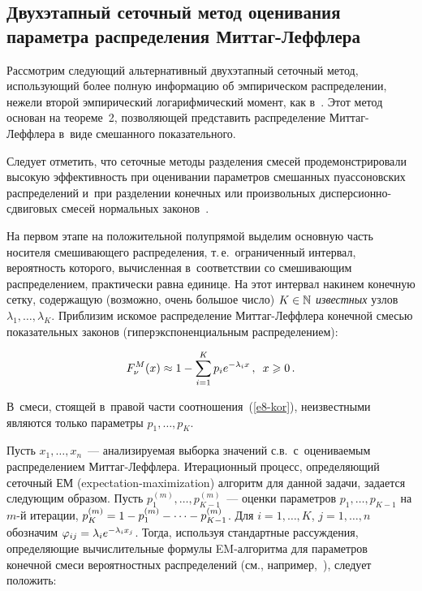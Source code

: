 \begin{multicols}{2}
{}

\subsection{Двухэтапный сеточный метод оценивания параметра
распределения Миттаг-Леффлера}

Рассмотрим следующий альтернативный двухэтапный сеточный метод,
использующий более полную информацию об эмпирическом распределении,
нежели второй эмпирический логарифмический момент, как 
в~\cite{Cahoy2013}. Этот метод основан на теореме~2, позволяющей
представить распределение Мит\-таг-Леф\-фле\-ра в~виде смешанного
показательного.

Следует отметить, что сеточные методы разделения смесей
продемонстрировали высокую эффективность при оценивании параметров
смешанных пуассоновских распределений и~при разделении конечных или
произвольных дис\-пер\-си\-он\-но-сдви\-го\-вых смесей нормальных 
законов~\cite{KorolevKorchagin2014, KorolevKorchaginZeifman2016}.

На первом этапе на положительной полупрямой выделим основную часть
носителя смешивающего распределения, т.\,е.\ ограниченный интервал,
вероятность которого, вычисленная в~соответствии со смешивающим
распределением, практически равна единице. На этот интервал накинем
конечную сетку, содержащую (возможно, очень большое чис\-ло)
$K\hm\in\mathbb{N}$ {\it известных} узлов $\lambda_1,\ldots ,\lambda_K$.
Приблизим искомое распределение Мит\-таг-Леф\-фле\-ра конечной смесью
показательных законов (гиперэкспоненциальным распределением):

\vspace*{2pt}

\noindent
\begin{equation}
F_{\nu}^{M}(x)\approx 1-\sum\limits_{i=1}^K p_ie^{-\lambda_ix}\,,\enskip
x\geqslant0\,.
\label{e8-kor}
\end{equation}

\vspace*{-2pt}

\noindent
В~смеси, стоящей в~правой части соотношения~(\ref{e8-kor}), неизвестными
являются только па\-ра\-мет\-ры $p_1,\ldots,p_{K}$. 

Пусть $x_1,\ldots,x_n$~---
анализируемая выборка значений с.в.\ с~оцениваемым
распределением Мит\-таг-Леф\-фле\-ра. Итерационный процесс, определяющий
сеточный ЕМ (expectation-maximization)
ал\-го\-ритм для данной задачи, за\-да\-ет\-ся сле\-ду\-ющим образом.
Пусть $p_1^{(m)},\ldots,p_{K-1}^{(m)}$~--- оценки параметров
$p_1,\ldots,p_{K-1}$ на $m$-й итерации,
$p_K^{(m)}\hm=1-p_1^{(m)}-\cdots-p_{K-1}^{(m)}$. Для $i=1,\ldots,K$,
$j=1,\ldots,n$ обозначим $\varphi_{ij}\hm=\lambda_ie^{-\lambda_ix_j}$. Тогда,
используя стандартные рассуждения, определяющие вычислительные
формулы EM-ал\-го\-рит\-ма для параметров конечной смеси вероятностных
распределений (см., например,~\cite[разд.~5.3.7--5.3.8]{Korolev2011}), 
следует положить:


\end{multicols}
